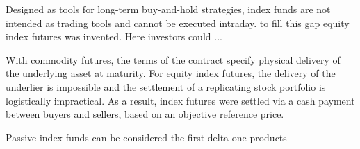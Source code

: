 Designed as tools for long-term buy-and-hold strategies, index funds are not intended as trading tools and cannot be executed intraday. to fill this gap equity index futures was invented. Here investors could ...

With commodity futures, the terms of the contract specify physical delivery of the underlying asset at maturity. For equity index futures, the delivery of the underlier is impossible and the settlement of a replicating stock portfolio is logistically impractical. As a result, index futures were settled via a cash payment between buyers and sellers, based on an objective reference price.

Passive index funds can be considered the first delta-one products
